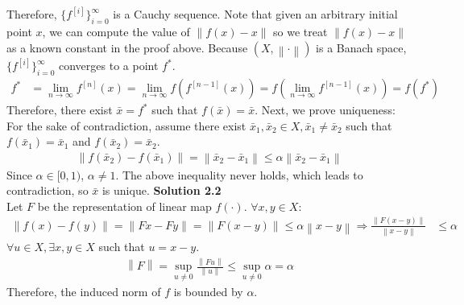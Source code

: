 \documentclass[fleqn, 10.5pt, a4paper]{article}
\theoremstyle{definition}
\numberwithin{equation}{section}
\newcommand{\norm}[1]{\left\lVert#1\right\rVert}
\begin{document}
Therefore, $\{f^{[i]}\}_{i=0}^{\infty}$ is a Cauchy sequence.
Note that given an arbitrary initial point $x$, we can compute the value of $\|f(x)-x\|$ so we treat $\|f(x)-x\|$ as a known constant in the proof above. Because $\left(X, \left\lVert\cdot\right\rVert\right)$ is a Banach space, $\{f^{[i]}\}_{i=0}^{\infty}$ converges to a point $f^*$.
\begin{align*}
	f^* &=\lim_{n\to\infty}f^{[n]}(x) = \lim_{n\to\infty}f\left(f^{[n-1]}(x)\right) = f\left(\lim_{n\to\infty}f^{[n-1]}(x)\right) = f(f^*) 
\end{align*}
Therefore, there exist $\bar{x}=f^*$ such that $f(\bar{x}) = \bar{x}$. Next, we prove uniqueness: For the sake of contradiction, assume there exist $\bar{x}_1,\bar{x}_2 \in X, \bar{x}_1 \neq \bar{x}_2$ such that $f(\bar{x}_1)=\bar{x}_1$ and $f(\bar{x}_2)=\bar{x}_2$.
\begin{align*}
	\norm{f(\bar{x}_2)-f(\bar{x}_1)} =\norm{\bar{x}_2-\bar{x}_1} \leq \alpha\norm{\bar{x}_2-\bar{x}_1}	
\end{align*}
Since $\alpha \in [0,1)$, $\alpha \neq 1$. The above inequality never holds, which leads to contradiction, so $\bar{x}$ is unique.
\noindent \textbf {Solution 2.2} \\
Let $F$ be the representation of linear map $f(\cdot)$. $\forall x,y \in X$:
\begin{align*}
\norm{f(x)-f(y)} = \norm{Fx-Fy} = \norm{F(x-y)} \leq \alpha \norm{x-y} \Rightarrow \frac{\norm{F(x-y)}}{\norm{x-y}} &\leq \alpha
\end{align*}
$\forall u \in X, \exists x,y \in X$ such that $u = x-y$.
\begin{align*}
\norm{F} = \sup_{u\neq 0}\frac{\norm{Fu}}{\norm{u}} \leq \sup_{u\neq 0} \alpha = \alpha
\end{align*}
Therefore, the induced norm of $f$ is bounded by $\alpha$.

\bigskip
\end{document}
